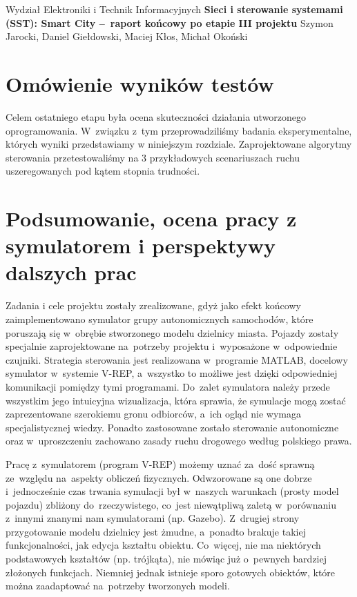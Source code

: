 \documentclass[11pt, a4paper, twoside]{article}
\begin{document}
	
	\begin{center} 
		{\Large Wydział Elektroniki i Technik Informacyjnych}
		\vskip0.2cm
		{\LARGE \textbf{Sieci i sterowanie systemami (SST): Smart City --~raport końcowy po etapie III projektu } } 
		\vskip0.3cm
		{\Large Szymon Jarocki, Daniel Giełdowski, Maciej Kłos, Michał Okoński}
		\vskip0.8cm
	\end{center} 	


\section{Omówienie wyników testów}
\label{sec:Wyniki}
Celem ostatniego etapu była ocena skuteczności działania utworzonego oprogramowania. W~związku z~tym przeprowadziliśmy badania eksperymentalne, których wyniki przedstawiamy w niniejszym rozdziale. Zaprojektowane algorytmy sterowania przetestowaliśmy na 3 przykładowych scenariuszach ruchu uszeregowanych pod kątem stopnia trudności.




\section{Podsumowanie, ocena pracy z symulatorem i perspektywy dalszych prac}
\label{sec:Final}
Zadania i cele projektu zostały zrealizowane, gdyż jako efekt końcowy zaimplementowano symulator grupy autonomicznych samochodów, które poruszają się w~obrębie stworzonego modelu dzielnicy miasta. Pojazdy zostały specjalnie zaprojektowane na~potrzeby projektu i~wyposażone w~odpowiednie czujniki. Strategia sterowania jest realizowana w~programie MATLAB, docelowy symulator w~systemie \mbox{V-REP}, a~wszystko to możliwe jest dzięki odpowiedniej komunikacji pomiędzy tymi programami. Do~zalet symulatora należy przede wszystkim jego intuicyjna wizualizacja, która sprawia, że symulacje mogą zostać zaprezentowane szerokiemu gronu odbiorców, a~ich ogląd nie wymaga specjalistycznej wiedzy. Ponadto zastosowane zostało sterowanie autonomiczne oraz w~uproszczeniu zachowano zasady ruchu drogowego według polskiego prawa.

Pracę z~symulatorem (program V-REP) możemy uznać za~dość sprawną ze~względu na~aspekty obliczeń fizycznych. Odwzorowane są one dobrze i~jednocześnie czas trwania symulacji był w~naszych warunkach (prosty model pojazdu) zbliżony do~rzeczywistego, co~jest niewątpliwą zaletą w~porównaniu z~innymi znanymi nam symulatorami (np. Gazebo). Z~drugiej strony przygotowanie modelu dzielnicy jest żmudne, a~ponadto brakuje takiej funkcjonalności, jak edycja kształtu obiektu. Co~więcej, nie ma niektórych podstawowych kształtów (np. trójkąta), nie mówiąc już o~pewnych bardziej złożonych funkcjach. Niemniej jednak istnieje sporo gotowych obiektów, które można zaadaptować na~potrzeby tworzonych modeli. 
\end{document}
